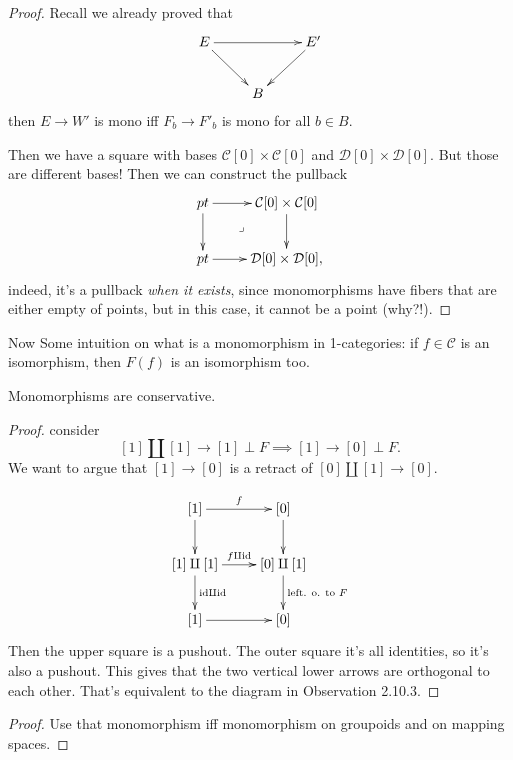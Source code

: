 \begin{proof}
Recall we already proved that
$$
\xymatrix{
E \ar[rd] \ar[rr] && E' \ar[dl] \\
& B
}
$$
then $E \to W'$ is mono iff $F_b \to F'_b$ is mono for all $b \in B$.

Then we have a square with bases $\mathcal{C}[0] \times \mathcal{C}[0]$ 
and $\mathcal{D}[0]\times \mathcal{D}[0]$. But those are different bases!
Then we can construct the pullback
$$
\xymatrix{
pt\ar[r]\ar[d]\ar@{}[dr]|-{\lrcorner}&\mathcal{C}[0]\times\mathcal{C}[0]\ar[d]\\
pt\ar[r]&\mathcal{D}[0]\times\mathcal{D}[0],
}
$$
indeed, it's a pullback {\it when it exists}, since
monomorphisms have fibers that are either empty of points,
but in this case, it cannot be a point (why?!).
\end{proof}

\noindent
Now Some intuition on what is a monomorphism in 1-categories:
if $f\in \mathcal{C}$ is an isomorphism, then $F(f)$ is an isomorphism too.

\begin{lemma}
\label{lemma-monomorphisms-are-conservative}
Monomorphisms are conservative.
\end{lemma}

\begin{proof}
consider
$$
[1] \amalg [1] \to [1] \perp F \implies  [1] \to [0] \perp F.
$$
We want to argue that $[1] \to [0]$ is a retract of
$[0] \amalg [1]\to [0]$.

$$
\xymatrix{
[1]\ar[d]\ar[r]^f&[0]\ar[d]\\
[1] \amalg [1]\ar[r]^{f \amalg \text{id}}\ar[d]^{\text{id} \amalg \text{id}}&
[0] \amalg[1]\ar[d]^{\text{left. o. to }F}\\
[1]\ar[r]& [0]
}
$$
Then the upper square is a pushout.
The outer square it's all identities, so it's also a pushout.
This gives that the two vertical lower arrows
are orthogonal to each other.
That's equivalent to the diagram in Observation 2.10.3.
\end{proof}

\begin{lemma}
\label{lemma-fully-faithful-are-conservative}

\end{lemma}

\begin{proof}
Use that monomorphism iff monomorphism on groupoids
and on mapping spaces.
\end{proof}






